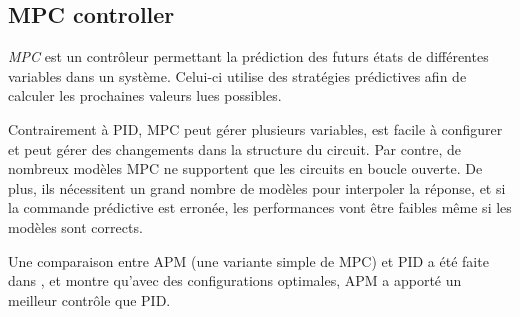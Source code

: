 \subsection{MPC controller}
\emph{MPC} est un contrôleur permettant la prédiction des futurs états de différentes variables dans un système.
Celui-ci utilise des stratégies prédictives afin de calculer les prochaines valeurs lues possibles.

Contrairement à PID, MPC peut gérer plusieurs variables, est facile à configurer et peut gérer des changements dans la structure du circuit.
Par contre, de nombreux modèles MPC ne supportent que les circuits en boucle ouverte.
De plus, ils nécessitent un grand nombre de modèles pour interpoler la réponse, et si la commande prédictive est erronée, les performances vont être faibles même si les modèles sont corrects.

Une comparaison entre APM (une variante simple de MPC) et PID a été faite dans \cite{saletovic2014apm}, et montre qu'avec des configurations optimales, APM a apporté un meilleur contrôle que PID.
